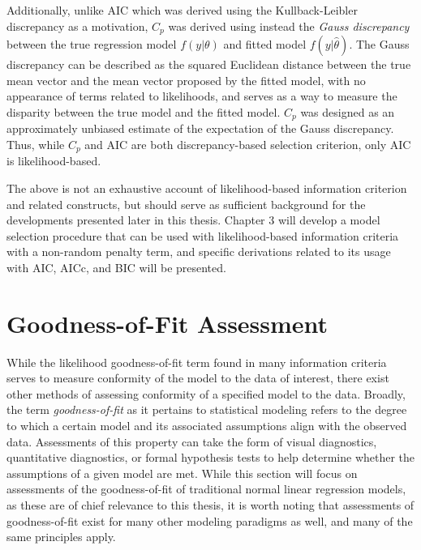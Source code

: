 		Additionally, unlike AIC which was derived using the Kullback-Leibler discrepancy as a motivation, $C_p$ was derived using instead the \textit{Gauss discrepancy} between the true regression model
		$f(y|\theta)$ and fitted model $f(y|\hat{\theta})$. The Gauss discrepancy can be described as the squared Euclidean distance between the true mean vector and the mean vector proposed by the fitted
		model, with no appearance of terms related to likelihoods, and serves as a way to measure the disparity between the true model and the fitted model. $C_p$ was designed as an approximately unbiased
		estimate of the expectation of the Gauss discrepancy. Thus, while $C_p$ and AIC are both discrepancy-based selection criterion, only AIC is likelihood-based.

		The above is not an exhaustive account of likelihood-based information criterion and related constructs, but should serve as sufficient background for the developments presented
		later in this thesis. Chapter 3 will develop a model selection procedure that can be used with likelihood-based information criteria with a non-random penalty term, and specific
		derivations related to its usage with AIC, AICc, and BIC will be presented.
		
		\section{Goodness-of-Fit Assessment}

		While the likelihood goodness-of-fit term found in many information criteria serves to measure conformity of the model to the data of interest, there exist other methods of
		assessing conformity of a specified model to the data. Broadly, the term \textit{goodness-of-fit} as it pertains to statistical modeling refers to the degree to which a certain model
		and its associated assumptions align with the observed data. Assessments of this property can take the form of visual diagnostics, quantitative diagnostics, or formal hypothesis tests to help
		determine whether the assumptions of a given model are met. While this section will focus on assessments of the goodness-of-fit of traditional normal linear regression models, as these are of
		chief relevance to this thesis, it is worth noting that assessments of goodness-of-fit exist for many other modeling paradigms as well, and many of the same principles apply.

